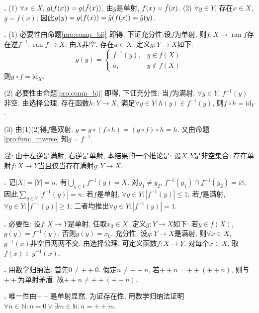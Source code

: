\par \textbf{\thesolset .} (1) $\forall x\in X$, $g(f(x))=g(\Tilde{f}(x))$, 由$g$是单射, $f(x)=\Tilde{f}(x)$. (2) $\forall y\in Y$, 存在$x\in X$, $y=f(x)$; 因此$g(y)=g(f(x))=\Tilde{g}(f(x))=\Tilde{g}(y)$. 

\par \textbf{\thesolset .} (1) 必要性由命题\ref{pro:comp_bij} 即得, 下证充分性:设$f$为单射, 则$f:X\to \operatorname{ran}f$存在逆$f^{-1}:\operatorname{ran}f\to X$. 由$X$非空, 存在$a\in X$. 定义$g:Y\to X$如下: 
\begin{equation*}
g(y)=
\begin{cases}
f^{-1}(y),& y\in f(X)\\
a, & y\notin f(X)
\end{cases}
\end{equation*}
则$g\circ f=\mathrm{id}_X$.
\par (2) 必要性由命题\ref{pro:comp_bij} 即得, 下证充分性: 当$f$为满射, $\forall y\in Y$, $f^{-1}(y)$非空. 由选择公理, 存在函数$h:Y\to X$, 满足$\forall y \in Y: h(y)\in f^{-1}(y)$, 则$f\circ h=\mathrm{id}_Y$.
\par (3) 由(1)(2)得$f$是双射.  $g=g\circ(f\circ h)=(g\circ f)\circ h=h$. 又由命题\ref{pro:func_inverse} 知$g=f^{-1}$. 
\par \emph{注:} 由于左逆是满射, 右逆是单射, 本结果的一个推论是: 设$X,Y$是非空集合, 存在单射$f:X\to Y$当且仅当存在满射$g:Y\to X$. 

\par \textbf{\thesolset .} 记$|X|=|Y|=n$, 有$\bigcup_{y\in Y} f^{-1}(y)=X$. 对$y_1\neq y_2$, $f^{-1}(y_1)\cap f^{-1}(y_2)=\varnothing$, 因此$\sum_{y\in Y} |f^{-1}(y)|=n$. 若$f$是单射, $\forall y\in Y: |f^{-1}(y)|\le 1$; 若$f$是满射, $\forall y\in Y: |f^{-1}(y)|\ge 1$; 二者均推出$\forall y\in Y: |f^{-1}(y)|=1$. 

\par \textbf{\thesolset .} 必要性: 设$f: X\to Y$是单射, 任取$x_0\in X$. 定义$g: Y\to X$如下: 若$y\in f(X)$, $g(y)=f^{-1}(y)$; 否则$g(y)=x_0$. 充分性: 设$g: Y\to X$是满射, 则$\forall x\in X$, $g^{-1}(x)$非空且两两不交. 由选择公理, 可定义函数$f: X\to Y$, 对每个$x\in X$, 取$f(x)\in g^{-1}(x)$. 

\par \textbf{\thesolset .}  用数学归纳法. 首先$0\neq ++0$. 假定$n\neq ++n$, 若$++n=++(++n)$, 则与$++$为单射矛盾. 故$++n \neq ++(++n)$. 

\par \textbf{\thesolset .} 唯一性由$++$是单射显然. 为证存在性, 用数学归纳法证明$\forall n\in \mathbb{N}: n=0\lor \exists m\in \mathbb{N}:n=++m$. 

